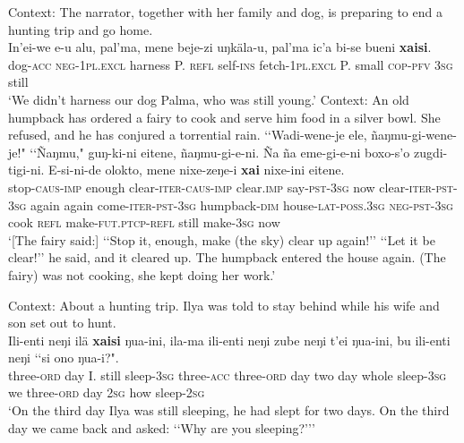 \begin{exe}
	\ex\label{exAppendixUdihe1}
	Context: The narrator, together with her family and dog, is preparing to end a hunting trip and go home.\\
	\gll In’ei-we e-u alu, pal’ma, mene beje-zi uŋkäla-u, pal’ma ic’a bi-se bueni \textbf{xaisi}.\\
	dog-\textsc{acc} \textsc{neg}-1\textsc{pl}.\textsc{excl} harness P. \textsc{refl} self-\textsc{ins} fetch-1\textsc{pl}.\textsc{excl} P. small \textsc{cop}-\textsc{pfv} 3\textsc{sg} still\\
	\glt \lq We didn’t harness our dog Palma, who was still young.\rq{ }\parencite[A tame roe cub named Wasya]{NikolaevaEtAl2019}
	\pagebreak
	\ex\label{exAppendixUdihe2}
	Context: An old humpback has ordered a fairy to cook and serve him food in a silver bowl. She refused, and he has conjured a torrential rain.
	\gll \lq\lq Wadi-wene-je ele, ñaŋmu-gi-wene-je!" \lq\lq Ñaŋmu," guŋ-ki-ni eitene, ñaŋmu-gi-e-ni. Ña ña eme-gi-e-ni boxo-s’o zugdi-tigi-ni. E-si-ni-de olokto, mene nixe-zeŋe-i \textbf{xai} nixe-ini eitene.\\
	\phantom{\lq\lq}stop-\textsc{caus}-\textsc{imp} enough clear-\textsc{iter}-\textsc{caus}-\textsc{imp} \phantom{\lq\lq{}}clear.\textsc{imp} say-\textsc{pst}-3\textsc{sg} now clear-\textsc{iter}-\textsc{pst}-3\textsc{sg} again again come-\textsc{iter}-\textsc{pst}-3\textsc{sg} humpback-\textsc{dim} house-\textsc{lat}-\textsc{poss}.3\textsc{sg} \textsc{neg}-\textsc{pst}-3\textsc{sg} cook \textsc{refl} make-\textsc{fut}.\textsc{ptcp}-\textsc{refl} still make-3\textsc{sg} now\\
	\glt \lq [The fairy said:] \lq\lq{}Stop it, enough, make (the sky) clear up again!\rq\rq{ }\lq\lq{}Let it be clear!\rq\rq{ }he said, and it cleared up. The humpback entered the house again. (The fairy) was not cooking, she kept doing her work.\rq{ }\parencite[35, 37]{NikolaevaEtAl2002} 

	\ex\label{exAppendixUdihe3}
	Context: About a hunting trip. Ilya was told to stay behind while his wife and son set out to hunt.\\
	\gll Ili-enti neŋi ilä \textbf{xaisi} ŋua-ini, ila-ma ili-enti neŋi zube neŋi t'ei ŋua-ini, bu ili-enti neŋi \lq\lq si ono ŋua-i?".\\
	three-\textsc{ord} day I. still sleep-3\textsc{sg} three-\textsc{acc} three-\textsc{ord} day two day whole sleep-3\textsc{sg} we three-\textsc{ord} day \phantom{\lq\lq}2\textsc{sg} how sleep-2\textsc{sg}\\
	\glt \lq On the third day Ilya was still sleeping, he had slept for two days. On the third day we came back and asked: \lq\lq Why are you sleeping?{\rq\rq}\rq{ }\parencite[A hunting trip]{NikolaevaEtAl2019}
\end{exe}

